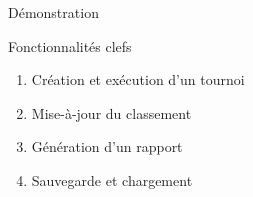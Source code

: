 \begin{frame}{Démonstration}
  \begin{block}{Fonctionnalités clefs}
    \begin{enumerate}
    \item Création et exécution d'un tournoi
    \item Mise-à-jour du classement
    \item Génération d'un rapport
    \item Sauvegarde et chargement
    \end{enumerate}
  \end{block}
\end{frame}
